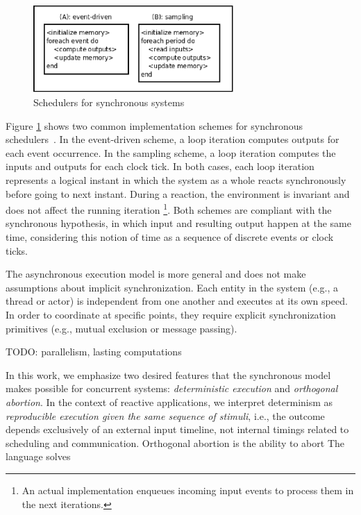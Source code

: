 \documentclass{acm_proc_article-sp}
\newcommand{\CEU}{\textsc{C\'{e}u}\xspace}
\newcommand{\1}{\;}
\newcommand{\2}{\;\;}
\newcommand{\3}{\;\;\;}
\newcommand{\5}{\;\;\;\;\;}
\begin{document}
\begin{figure}
\centering
\includegraphics[width=3.0in]{sync_impl.eps}
\caption{Schedulers for synchronous systems}
\label{fig.impl}
\end{figure}

Figure \ref{fig.impl} shows two common implementation schemes for synchronous 
schedulers~\cite{rp.twelve}.
%
In the event-driven scheme, a loop iteration computes outputs for each event 
occurrence.
%
In the sampling scheme, a loop iteration computes the inputs and outputs for 
each clock tick.
%
In both cases, each loop iteration represents a logical instant in which the 
system as a whole reacts synchronously before going to next instant.
%
During a reaction, the environment is invariant and does not affect the running 
iteration%
\footnote{
An actual implementation enqueues incoming input events to process them in the 
next iterations.
}.
%
Both schemes are compliant with the synchronous hypothesis, in which input and 
resulting output happen at the same time, considering this notion of time as a 
sequence of discrete events or clock ticks.

The asynchronous execution model is more general and does not make assumptions 
about implicit synchronization.
Each entity in the system (e.g., a thread or actor) is independent from one 
another and executes at its own speed.
In order to coordinate at specific points, they require explicit 
synchronization primitives (e.g., mutual exclusion or message passing).

TODO: parallelism, lasting computations


In this work, we emphasize two desired features that the synchronous model 
makes possible for concurrent systems: \emph{deterministic execution} and 
\emph{orthogonal abortion}.
%
In the context of reactive applications, we interpret determinism as 
\emph{reproducible execution given the same sequence of stimuli}, i.e., the 
outcome depends exclusively of an external input timeline, not internal timings 
related to scheduling and communication.
%
Orthogonal abortion is the ability to abort
%
The language solves
\end{document}
